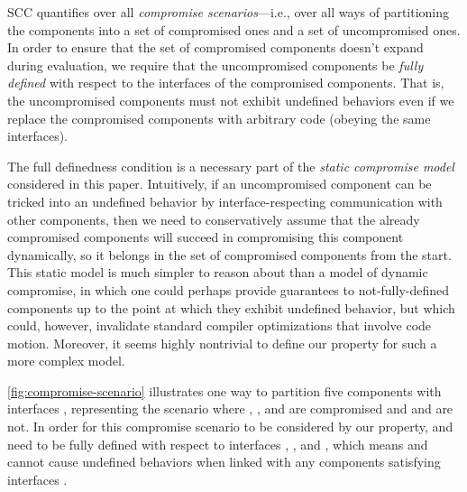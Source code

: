 \documentclass[10pt, conference, compsocconf, letterpaper, times]{IEEEtran}
\begin{document}
SCC quantifies over all {\em compromise
  scenarios}---i.e., over all ways of partitioning the components
into a set of compromised ones and a set of uncompromised ones.
In order to ensure that the set
  of compromised components doesn't expand during evaluation,
we require that the uncompromised components be {\em fully defined}
with respect to the interfaces of the compromised components.
That is, the uncompromised components must not exhibit undefined
behaviors
even if we replace the compromised components with arbitrary code (obeying
the same interfaces).



The full definedness condition is a necessary part of
the {\em static compromise model} considered in this paper.
Intuitively, if an uncompromised component can be tricked into an
undefined behavior by interface-respecting communication with other
components, then we need to conservatively assume that the already
compromised components will succeed in compromising this component
dynamically, so it belongs in the set of compromised components from
the start.
This static model is much simpler to reason about than a model of
dynamic compromise, in which one could perhaps provide guarantees to
not-fully-defined components up to the point at which they exhibit
undefined behavior, but which could, however, invalidate standard
compiler optimizations that involve code motion.
Moreover, it seems highly nontrivial to define our property for such a
more complex model.

\autoref{fig:compromise-scenario} illustrates one way to partition
five components  with interfaces ,
representing the scenario where , , and  are
compromised and  and  are not.
In order for this compromise scenario to be considered by our property,
 and  need to be fully defined with respect to interfaces
, , and , which means  and  cannot cause
undefined behaviors when linked with any components 
satisfying interfaces .
\end{document}
